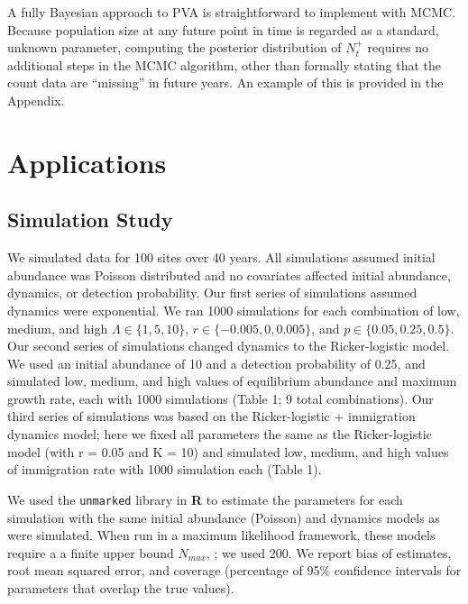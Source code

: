 \documentclass[12pt]{article}
\begin{document}
A fully Bayesian approach to PVA is straightforward to
implement with MCMC. Because population size at any future point %
in time is regarded as a standard, unknown parameter, computing the
posterior distribution of $N^+_t$ requires no additional steps
in the MCMC algorithm, other than formally stating that the count data are
``missing'' in future years. An example of this is provided in the Appendix.



\section{Applications}
\label{sec:app}

\subsection{Simulation Study}


We simulated data for 100 sites over 40 years.  All
simulations assumed initial abundance was Poisson distributed
and no covariates affected initial abundance, dynamics, or
detection probability.  Our first series of simulations
assumed dynamics were exponential.  We ran 1000 simulations for
each combination of low, medium, and high $\Lambda \in
\{1,5,10\}$, $r \in \{-0.005, 0, 0.005\}$, and
$p \in \{0.05, 0.25, 0.5\}$. %
Our second series of simulations changed dynamics to the Ricker-logistic
model. We used an initial abundance of 10 and a detection probability
of 0.25, and simulated low, medium, and high values of equilibrium
abundance and maximum growth rate, each with 1000 simulations (Table 1;
9 total combinations). Our third series of simulations was based
on the Ricker-logistic + immigration dynamics model; here we fixed all
parameters the same as the Ricker-logistic model (with r = 0.05 and K = 10) and
simulated low, medium, and high values of immigration rate with 1000
simulation each (Table 1).

We used the \texttt{unmarked} library in \textbf{R} to estimate the parameters 
for each simulation with the same
initial abundance (Poisson) and dynamics models as were simulated.
When run in a maximum likelihood framework, these models require a
a finite upper bound $N_{max}$,
\citep{royle:2004biom,dail_madsen:2011};
we used 200.  We report bias of estimates, root
mean squared error, and coverage (percentage of 95\% confidence
intervals for parameters that overlap the true values).
\end{document}
